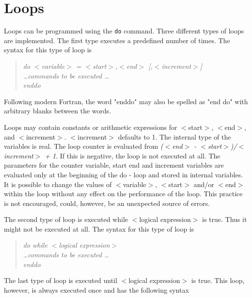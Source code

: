 
\section{Loops \label{do}}

Loops can be programmed using the {\tt do} command.
Three different types of loops are implemented. The first type
executes a predefined number of times. The syntax for this type of
loop is

\begin{quote}
{\it do $<$variable$>$ = $<$start$>$,$<$end$>$ [,$<$increment$>$] \\
     \ldots commands to be executed \ldots \\
     enddo }
\end{quote}

Following modern Fortran, the word "enddo" may
also be spelled as "end do" with arbitrary blanks
between the words.

Loops may contain constants or arithmetic expressions for
$<$start$>$, $<$end$>$, and $<$increment$>$.  $<$increment$>$
defaults to 1.  The internal type of the variables is real.  The
loop counter is evaluated from {\it ($<$end$>$ -
$<$start$>$)/$<$increment$>$ + 1}. If this is negative, the loop is
not executed at all.  The parameters for the counter variable, start
end and increment variables are evaluated only at the beginning of
the do - loop and stored in internal variables.  It is possible to
change the values of $<$variable$>$, $<$start$>$ and/or $<$end$>$
within the loop without any effect on the performance of the loop.
This practice is not encouraged, could, however, be an unexpected
source of errors. \par

The second type of loop is executed while $<$logical expression$>$ is
true. Thus it might not be executed at all. The syntax for this type
of loop is

\begin{quote}
{\it do while $<$logical expression$>$ \\
     \ldots commands to be executed \ldots \\
     enddo }
\end{quote}

The last type of loop is executed until $<$logical expression$>$ is
true. This loop, however, is always executed once and has the
following syntax

